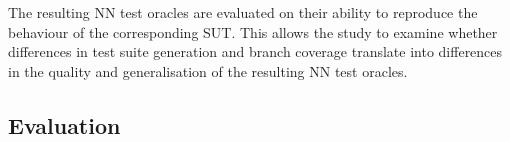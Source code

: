 \documentclass[runningheads]{llncs}
\begin{document}
The resulting NN test oracles are evaluated on their ability to reproduce the behaviour of the corresponding SUT. This allows the study to examine whether differences in test suite generation and branch coverage translate into differences in the quality and generalisation of the resulting NN test oracles.

\subsection{Evaluation}


\end{document}
